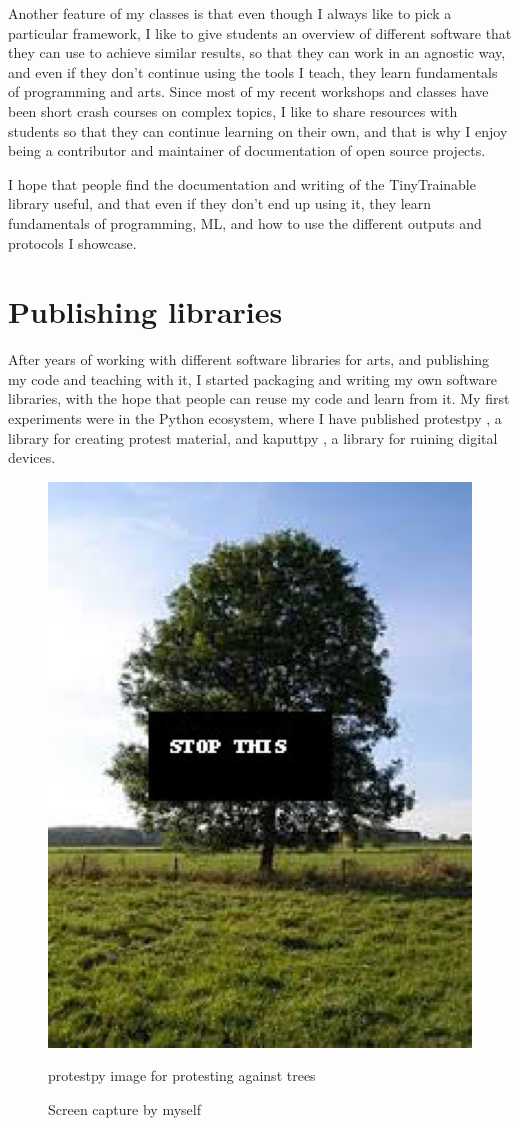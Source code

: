 Another feature of my classes is that even though I always like to pick a particular framework, I like to give students an overview of different software that they can use to achieve similar results, so that they can work in an agnostic way, and even if they don't continue using the tools I teach, they learn fundamentals of programming and arts. Since most of my recent workshops and classes have been short crash courses on complex topics, I like to share resources with students so that they can continue learning on their own, and that is why I enjoy being a contributor and maintainer of documentation of open source projects.

I hope that people find the documentation and writing of the TinyTrainable library useful, and that even if they don't end up using it, they learn fundamentals of programming, \acrshort{ML}, and how to use the different outputs and protocols I showcase.

\section{Publishing libraries}

After years of working with different software libraries for arts, and publishing my code and teaching with it, I started packaging and writing my own software libraries, with the hope that people can reuse my code and learn from it. My first experiments were in the Python ecosystem, where I have published protestpy \cite{website-pypi-protestpy}, a library for creating protest material, and kaputtpy \cite{website-pypi-kaputtpy}, a library for ruining digital devices.

\begin{figure}[ht]
  \centering
  \includegraphics[width=0.75\linewidth,height=0.35\textheight,keepaspectratio]{images/protestpy.jpg}
  \caption{protestpy image for protesting against trees}
  \caption*{Screen capture by myself}
  \label{fig:protestpy-tree}
\end{figure}

